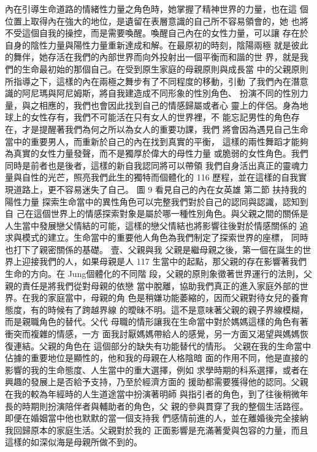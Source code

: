 內在引導生命道路的情緒性力量之角色時，她掌握了精神世界的力量，也在這
個位置上取得內在強大的地位，是遺留在表層意識的自己所不容易領會的，她
也將不受這個自我的操控，而是需要喚醒。喚醒自己內在的女性力量，可以讓
存在於自身的陰性力量與陽性力量重新達成和解。在最原初的時刻，陰陽兩極
就是彼此的舞伴，她存活在我們的內部世界而向外投射出一個平衡而和諧的世
界，就是我們的生命最初始的那個自己。在受到原生家庭的母親原則與成長當
中的父親原則所指導之下，這樣的內在兩極之舞步有了不同程度的移動，引動
了我們內在潛意識的阿尼瑪與阿尼姆斯，將自我建造成不同形象的性別角色、
扮演不同的性別力量，與之相應的，我們也會因此找到自己的情感歸屬或者心
靈上的伴侶。身為地球上的女性存有，我們不可能活在只有女人的世界裡，不
能忘記男性的角色存在，才是提醒著我們為何之所以為女人的重要功課，我們
將會因為遇見自己生命當中的重要男人，而重新於自己的內在找到真實的平衡，
這樣的兩性舞蹈才能夠為真實的女性力量發聲，而不是獨厚於偉大的母性力量
或脆弱的女性角色。我們同時是前者也是後者，這樣的新自我認同將可以帶領
我們自身活出真正的靈魂力量與自性的光芒，照亮我們此生的獨特而個體化的
116 
歷程，並在這樣的自我實現道路上，更不容易迷失了自己。 
圖 9  
看見自己的內在女英雄 
第二節 扶持我的陽性力量 
探索生命當中的異性角色可以完整我們對於自己的認同與認識，認知到自
己在這個世界上的情感探索對象是屬於哪一種性別角色。與父親之間的關係是
人生當中發展戀父情結的可能，這樣的戀父情結也將影響往後對於情感關係的
追求與模式的建立。生命當中的重要他人角色為我們制定了探索世界的座標，
同時也打下了親密關係的基礎。 
壹、父親與我 
父親是繼母親之後，第一個在誕生的世界上迎接我們的人，如果母親是人
117 
生當中的起點，那父親的存在影響著我們生命的方向。在 Jung個體化的不同階
段，父親的原則象徵著世界運行的法則，父親的責任是將我們從對母親的依戀
當中脫離，協助我們真正的進入家庭外部的世界。在我的家庭當中，母親的角
色是稍嫌功能萎縮的，因而父親對待女兒的養育態度，有的時候有了跨越界線
的曖昧不明。這不是意味著父親的親子界線模糊，而是親職角色的替代。父代
母職的情形讓我在生命當中對於媽媽這樣的角色有著衝突而複雜的情感，一方
面我討厭媽媽帶給人的感覺，另一方面又渴望與媽媽恢復連結。父親的角色在
這個部分的缺失有功能替代的情形。 
父親在我的生命當中佔據的重要地位是顯性的，他和我的母親在人格陰暗
面的作用不同，他是直接的影響的我的生命態度、人生當中的重大選擇，例如
求學時期的科系選擇，或者在興趣的發展上是否給予支持，乃至於經濟方面的
援助都需要獲得他的認同。父親在我的較為年經時的人生道途當中扮演著明師
與指引者的角色，到了往後稍微年長的時期則扮演陪伴者與輔助者的角色，父
親的參與貫穿了我的整個生活路徑。即便在婚姻當中他也默默的當一個支持我
們感情前進的人，並在離婚後完全接納我回歸原本的家庭生活。父親對於我的
正面影響是充滿著愛與包容的力量，而且這樣的如深似海是母親所做不到的。

